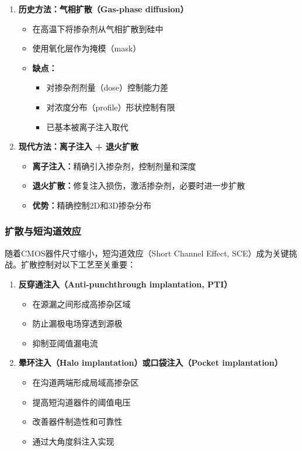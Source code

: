 \documentclass[UTF8,12pt,a4paper]{ctexart}
\begin{document}
\begin{enumerate}
    \item \textbf{历史方法：气相扩散（Gas-phase diffusion）}
    \begin{itemize}
        \item 在高温下将掺杂剂从气相扩散到硅中
        \item 使用氧化层作为掩模（mask）
        \item \textbf{缺点：}
        \begin{itemize}
            \item 对掺杂剂剂量（dose）控制能力差
            \item 对浓度分布（profile）形状控制有限
            \item 已基本被离子注入取代
        \end{itemize}
    \end{itemize}
    
    \item \textbf{现代方法：离子注入 + 退火扩散}
    \begin{itemize}
        \item \textbf{离子注入：}精确引入掺杂剂，控制剂量和深度
        \item \textbf{退火扩散：}修复注入损伤，激活掺杂剂，必要时进一步扩散
        \item \textbf{优势：}精确控制2D和3D掺杂分布
    \end{itemize}
\end{enumerate}

\subsubsection{扩散与短沟道效应}

随着CMOS器件尺寸缩小，短沟道效应（Short Channel Effect, SCE）成为关键挑战。扩散控制对以下工艺至关重要：

\begin{enumerate}
    \item \textbf{反穿通注入（Anti-punchthrough implantation, PTI）}
    \begin{itemize}
        \item 在源漏之间形成高掺杂区域
        \item 防止漏极电场穿透到源极
        \item 抑制亚阈值漏电流
    \end{itemize}
    
    \item \textbf{晕环注入（Halo implantation）或口袋注入（Pocket implantation）}
    \begin{itemize}
        \item 在沟道两端形成局域高掺杂区
        \item 提高短沟道器件的阈值电压
        \item 改善器件制造性和可靠性
        \item 通过大角度斜注入实现
    \end{itemize}
\end{enumerate}
\end{document}

